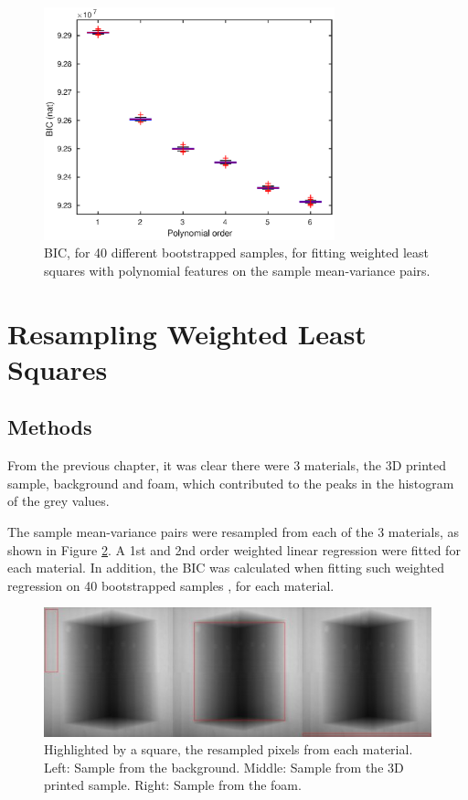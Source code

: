 \documentclass[12pt]{report}
\begin{document}
\begin{figure}
	\centering
	\includegraphics[width=0.75\textwidth]{figures/meanVar/polynomialBIC.eps}
	\caption{BIC, for 40 different bootstrapped samples, for fitting weighted least squares with polynomial features on the sample mean-variance pairs.}
	\label{fig:weightedLS_BIC}
\end{figure}

\section{Resampling Weighted Least Squares}
\subsection{Methods}
From the previous chapter, it was clear there were 3 materials, the 3D printed sample, background and foam, which contributed to the peaks in the histogram of the grey values.

The sample mean-variance pairs were resampled from each of the 3 materials, as shown in Figure \ref{fig:subsample}. A 1st and 2nd order weighted linear regression were fitted for each material. In addition, the BIC was calculated when fitting such weighted regression on 40 bootstrapped samples \cite{efron1992bootstrap}, for each material.

\begin{figure}
	\includegraphics[width=\textwidth]{figures/meanVar/subsample_images.jpg}
	\caption{Highlighted by a square, the resampled pixels from each material. Left: Sample from the background. Middle: Sample from the 3D printed sample. Right: Sample from the foam.}
	\label{fig:subsample}
\end{figure}
\end{document}
